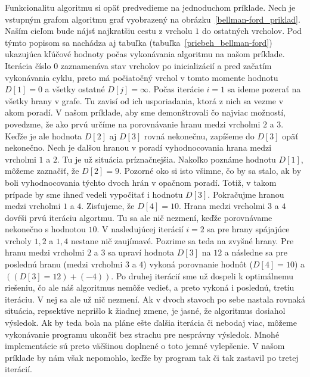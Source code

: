 Funkcionalitu algoritmu si opäť predvedieme na jednoduchom príklade. Nech je vstupným grafom algoritmu graf vyobrazený na obrázku~\ref{bellman-ford_priklad}. Naším cieľom bude nájsť najkratšiu cestu z vrcholu $1$ do ostatných vrcholov. Pod týmto popisom sa nachádza aj tabuľka (tabuľka~\ref{priebeh_bellman-ford}) ukazujúca kľúčové hodnoty počas vykonávania algoritmu na našom príklade. Iterácia číslo 0 zaznamenáva stav vrcholov po inicializácií a pred začatím vykonávania cyklu, preto má počiatočný vrchol v tomto momente hodnotu $D [1] = 0$ a všetky ostatné $D [j] = \infty$. Počas iterácie $i = 1$ sa ideme pozerať na všetky hrany v grafe. Tu zavisí od ich usporiadania, ktorá z nich sa vezme v akom poradí. V našom príklade, aby sme demonštrovali čo najviac možností, povedzme, že ako prvú určíme na porovnávanie hranu medzi vrcholmi $2$ a $3$. Keďže je ale hodnota $D[2]$ aj $D[3]$ rovná nekonečnu, zapíšeme do $D[3]$ opäť nekonečno. Nech je ďalšou hranou v poradí vyhodnocovania hrana medzi vrcholmi $1$ a $2$. Tu je už situácia príznačnejšia. Nakoľko poznáme hodnotu $D[1]$, môžeme zaznačiť, že $D[2] = 9$. Pozorné oko si isto všimne, čo by sa stalo, ak by boli vyhodnocovania týchto dvoch hrán v opačnom poradí. Totiž, v takom prípade by sme ihneď vedeli vypočitať i hodnotu $D[3]$. Pokračujme hranou medzi vrcholmi $1$ a $4$. Zisťujeme, že $D[4] = 10$. Hrana medzi vrcholmi $3$ a $4$ dovŕši prvú iteráciu algortmu. Tu sa ale nič nezmení, keďže porovnávame nekonečno s hodnotou $10$. V nasledujúcej iterácií $i = 2$ sa pre hrany spájajúce vrcholy $1, 2$ a $1, 4$ nestane nič zaujímavé. Pozrime sa teda na zvyšné hrany. Pre hranu medzi vrcholmi $2$ a $3$ sa upraví hodnota $D[3]$ na $12$ a následne sa pre poslednú hranu (medzi vrcholmi $3$ a $4$) vykoná porovnanie hodnôt ($D[4] = 10$) a $((D[3] = 12) + (-4))$. Po druhej iterácií sme už dospeli k optimálnemu riešeniu, čo ale náš algoritmus nemôže vedieť, a preto vykoná i poslednú, tretiu iteráciu. V nej sa ale už nič nezmení. Ak v dvoch stavoch po sebe nastala rovnaká situácia, repsektíve neprišlo k žiadnej zmene, je jasné, že algoritmus dosiahol výsledok. Ak by teda bola na pláne ešte ďalšia iterácia či nebodaj viac, môžeme vykonávanie programu ukončiť bez strachu pre nesprávny výsledok. Mnohé implementácie sú preto väčšinou doplnené o toto jemné vylepšenie. V našom príklade by nám však nepomohlo, keďže by program tak či tak zastavil po tretej iterácií.\newline

